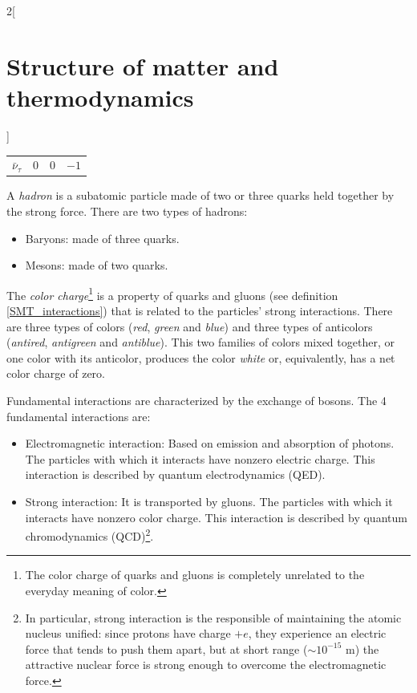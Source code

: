 \documentclass[../../../main.tex]{subfiles}
\begin{document}
\begin{multicols}{2}[\section{Structure of matter and thermodynamics}]
\begin{definition}
\begin{center}
\begin{minipage}{\linewidth}
\begin{tabular}{cccc}
                    $\bar{\nu}_\tau$ & 0     & 0       & $-1$     \\
                \end{tabular}
            \end{minipage}
        \end{center}
    \end{definition}
    \begin{definition}[Hadron]
        A \textit{hadron} is a subatomic particle made of two or three quarks held together by the strong force. There are two types of hadrons:
        \begin{itemize}
            \item Baryons: made of three quarks.
            \item Mesons: made of two quarks.
        \end{itemize}
    \end{definition}
    \begin{definition}\label{SMT_color}
        The \textit{color charge}\footnote{The color charge of quarks and gluons is completely unrelated to the everyday meaning of color.} is a property of quarks and gluons (see definition \ref{SMT_interactions}) that is related to the particles' strong interactions. There are three types of colors (\textit{red}, \textit{green} and \textit{blue}) and three types of anticolors (\textit{antired}, \textit{antigreen} and \textit{antiblue}). This two families of colors mixed together, or one color with its anticolor, produces the color \textit{white} or, equivalently, has a net color charge of zero.
    \end{definition}
    \begin{definition}\label{SMT_interactions}
        Fundamental interactions are characterized by the exchange of bosons. The 4 fundamental interactions are:
        \begin{itemize}
            \item Electromagnetic interaction: Based on emission and absorption of photons. The particles with which it interacts have nonzero electric charge. This interaction is described by quantum electrodynamics (QED).
            \item Strong interaction: It is transported by gluons. The particles with which it interacts have nonzero color charge. This interaction is described by quantum chromodynamics (QCD)\footnote{In particular, strong interaction is the responsible of maintaining the atomic nucleus unified: since protons have charge $+e$, they experience an electric force that tends to push them apart, but at short range ($\sim10^{-15}\text{ m}$) the attractive nuclear force is strong enough to overcome the electromagnetic force.}.

\end{itemize}
\end{definition}
\end{multicols}
\end{document}
